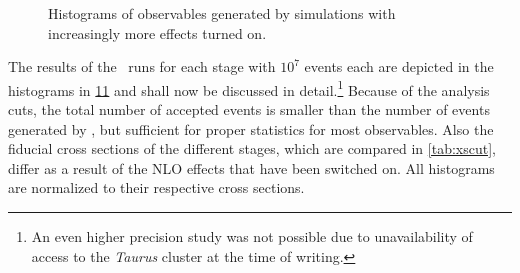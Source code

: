 \begin{figure}[ht]
  \centering
  \begin{subfigure}[t]{.49\textwidth}
    \caption{\label{fig:disc-total_pT}}
  \end{subfigure}
  \begin{subfigure}[t]{.49\textwidth}
    \caption{\label{fig:disc-azimuthal_angle}}
  \end{subfigure}
  \begin{subfigure}[t]{.49\textwidth}
    \caption{\label{fig:disc-pT}}
  \end{subfigure}
  \begin{subfigure}[t]{.49\textwidth}
    \caption{\label{fig:disc-pT_subl}}
  \end{subfigure}
  \begin{subfigure}[t]{.49\textwidth}
    \caption{\label{fig:disc-inv_m}}
  \end{subfigure}
\end{figure}
%
\begin{figure}[t]
  \centering \ContinuedFloat
  \begin{subfigure}[t]{.49\textwidth}
    \caption{\label{fig:disc-cos_theta}}
  \end{subfigure}
  \begin{subfigure}[t]{.49\textwidth}
    \caption{\label{fig:disc-eta}}
  \end{subfigure}
  \begin{subfigure}[t]{.49\textwidth}
    \caption{\label{fig:disc-o_angle}}
  \end{subfigure}
  \begin{subfigure}[t]{.49\textwidth}
    \caption{\label{fig:disc-o_angle_cs}}
  \end{subfigure}

  \caption{\label{fig:holhistos} Histograms of observables generated
    by simulations with increasingly more effects turned on.}
\end{figure}
%
The results of the \sherpa\ runs for each stage with \(10^7\) events
each are depicted in the histograms in \cref{fig:holhistos} and shall
now be discussed in detail.\footnote{An even higher precision study
  was not possible due to unavailability of access to the
  \emph{Taurus} cluster at the time of writing.}  Because of the
analysis cuts, the total number of accepted events is smaller than the
number of events generated by \sherpa, but sufficient for proper
statistics for most observables. Also the fiducial cross sections of
the different stages, which are compared in \cref{tab:xscut}, differ
as a result of the NLO effects that have been switched on. All
histograms are normalized to their respective cross sections.

